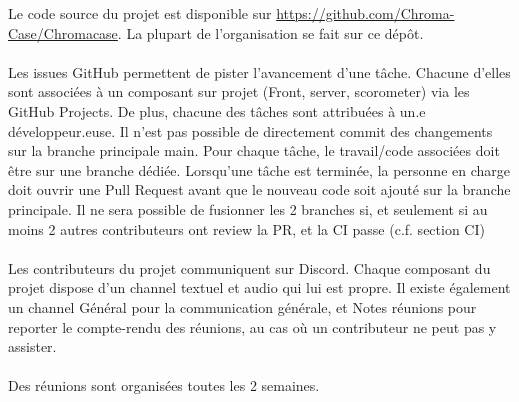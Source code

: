 Le code source du projet est disponible sur \url{https://github.com/Chroma-Case/Chromacase}.
La plupart de l’organisation se fait sur ce dépôt.
\\\\
Les issues GitHub permettent de pister l’avancement d’une tâche. Chacune d’elles sont associées à un composant sur projet (Front, server, scorometer) via les GitHub Projects. De plus, chacune des tâches sont attribuées à un.e développeur.euse.
Il n’est pas possible de directement commit des changements sur la branche principale main. Pour chaque tâche, le travail/code associées doit être sur une branche dédiée.
Lorsqu’une tâche est terminée, la personne en charge doit ouvrir une Pull Request avant que le nouveau code soit ajouté sur la branche principale. Il ne sera possible de fusionner les 2 branches si, et seulement si au moins 2 autres contributeurs ont review la PR, et la CI passe (c.f. section CI)
\\\\
Les contributeurs du projet communiquent sur Discord. Chaque composant du projet dispose d’un channel textuel et audio qui lui est propre. Il existe également un channel Général pour la communication générale, et Notes réunions pour reporter le compte-rendu des réunions, au cas où un contributeur ne peut pas y assister.
\\\\
Des réunions sont organisées toutes les 2 semaines.
